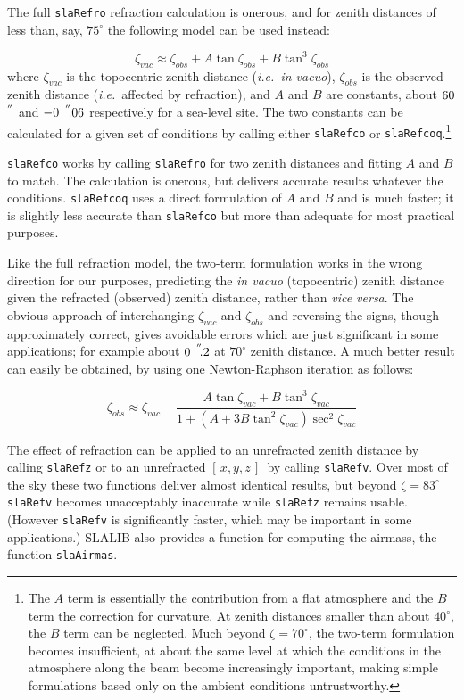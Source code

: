 \documentclass[11pt,fleqn,twoside]{article}
\renewcommand{\_}{{\tt\char'137}}     %
\newcommand{\xyz}       {$[\,x,y,z\,]$}
\newcommand{\arcseci}[1] {$#1\hspace{0.05em}$\raisebox{-0.5ex}
                         {$^{'\hspace{-0.1em}'\hspace{0.0em}}$}}
\newcommand{\arcsec}[2] {\arcseci{#1}$\hspace{-0.35em}.#2$}
\begin{document}
The full
{\tt slaRefro} refraction calculation is onerous, and for
zenith distances of less than, say, $75^{\circ}$ the following
model can be used instead:
 
\[ \zeta _{vac} \approx \zeta _{obs}
                     + A \tan \zeta _{obs}
                     + B \tan ^{3}\zeta _{obs} \]
where $\zeta _{vac}$ is the topocentric
zenith distance ({\it i.e.~in vacuo}),
$\zeta _{obs}$ is the observed
zenith distance ({\it i.e.}~affected by refraction), and $A$ and $B$ are
constants, about \arcseci{60}
and \arcsec{-0}{06} respectively for a sea-level site.
The two constants can be calculated for a given set of conditions
by calling either
{\tt slaRefco} or
{\tt slaRefcoq}.\footnote{The $A$ term is essentially the
contribution from a flat atmosphere and the $B$ term the
correction for curvature.  At zenith distances smaller than about
$40^\circ$, the $B$ term can be neglected.  Much beyond $\zeta=70^\circ$,
the two-term formulation becomes insufficient, at about the
same level at which
the conditions in the atmosphere along the beam
become increasingly important, making simple formulations based only on
the ambient conditions untrustworthy.}
 
{\tt slaRefco} works by calling
{\tt slaRefro} for two zenith distances and fitting $A$ and $B$
to match.  The calculation is onerous, but delivers accurate
results whatever the conditions.
{\tt slaRefcoq} uses a direct formulation of $A$ and $B$ and
is much faster;  it is slightly less accurate than
{\tt slaRefco} but more than adequate for most practical purposes.
 
Like the full refraction model, the two-term formulation works in the wrong
direction for our purposes, predicting
the {\it in vacuo}\/ (topocentric) zenith distance
given the refracted (observed) zenith distance,
rather than {\it vice versa}.  The obvious approach of
interchanging $\zeta _{vac}$ and $\zeta _{obs}$ and
reversing the signs, though approximately
correct, gives avoidable errors which are just significant in
some applications;  for
example about \arcsec{0}{2} at $70^\circ$ zenith distance.  A
much better result can easily be obtained, by using one Newton-Raphson
iteration as follows:
 
\[ \zeta _{obs} \approx \zeta _{vac}
    - \frac{A \tan \zeta _{vac} + B \tan ^{3}\zeta _{vac}}
    {1 + ( A + 3 B \tan ^{2}\zeta _{vac} ) \sec ^{2}\zeta _{vac}}\]
 
The effect of refraction can be applied to an unrefracted
zenith distance by calling
{\tt slaRefz} or to an unrefracted
\xyz\ by calling
{\tt slaRefv}.
Over most of the sky these two functions deliver almost identical
results, but beyond $\zeta=83^\circ$
{\tt slaRefv}
becomes unacceptably inaccurate while
{\tt slaRefz}
remains usable.  (However
{\tt slaRefv}
is significantly faster, which may be important in some applications.)
SLALIB also provides a function for computing the airmass, the function
{\tt slaAirmas}.
 
\end{document}
